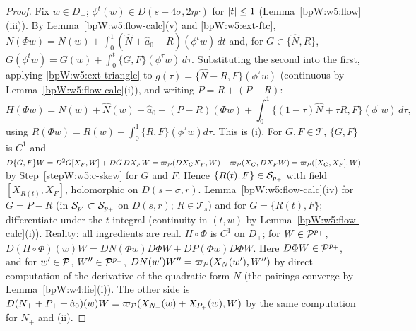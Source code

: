 \begin{proof}
\label{stepW:w5:n-exp} Fix $w\in D_+$; $\phi^t(w)\in D(s-4\sigma,2\eta r)$ for $\lvert t\rvert\le1$
(Lemma~\ref{bpW:w5:flow}(iii)). By Lemma~\ref{bpW:w5:flow-calc}(v) and \ref{bpW:w5:ext-ftc},
$N(\Phi w)=N(w)+\int_0^1(\hat N+\hat a_0-R)(\phi^tw)\,dt$ and, for $G\in\{\hat N,R\}$,
$G(\phi^tw)=G(w)+\int_0^t\{G,F\}(\phi^\tau w)\,d\tau$. Substituting the second into the first, applying
\ref{bpW:w5:ext-triangle} to $g(\tau)=\{\hat N-R,F\}(\phi^\tau w)$ (continuous by Lemma~\ref{bpW:w5:flow-calc}(i)), and writing
$P=R+(P-R)$:
\[H(\Phi w)=N(w)+\hat N(w)+\hat a_0+(P-R)(\Phi w)+\int_0^1\{(1-\tau)\hat N+\tau R,F\}(\phi^\tau w)\,d\tau,\]
using $R(\Phi w)=R(w)+\int_0^1\{R,F\}(\phi^\tau w)d\tau$. This is (i).
\label{stepW:w5:n-br} For $G,F\in\mathcal T$, $\{G,F\}$ is $C^1$ and
$D\{G,F\}W=D^2G[X_F,W]+DG\,DX_FW=\varpi_{\mathcal P}(DX_GX_F,W)+\varpi_{\mathcal P}(X_G,DX_FW)=\varpi_{\mathcal P}([X_G,X_F],W)$ by
Step~\ref{stepW:w5:c-skew} for $G$ and $F$. Hence $\{R(t),F\}\in\mathcal S_{p_+}$ with field $[X_{R(t)},X_F]$, holomorphic on
$D(s-\sigma,r)$.
\label{stepW:w5:n-field} Lemma~\ref{bpW:w5:flow-calc}(iv) for $G=P-R$ (in $\mathcal S_{p'}\subset\mathcal S_{p_+}$ on
$D(s,r)$; $R\in\mathcal T_s$) and for $G=\{R(t),F\}$; differentiate under the $t$-integral (continuity in $(t,w)$ by
Lemma~\ref{bpW:w5:flow-calc}(i)). Reality: all ingredients are real.
\label{stepW:w5:n-conj} $H\circ\Phi$ is $C^1$ on $D_+$; for $W\in\mathcal P^{p_+}$,
$D(H\circ\Phi)(w)W=DN(\Phi w)D\Phi W+DP(\Phi w)D\Phi W$. Here $D\Phi W\in\mathcal P^{p_+}$, and for $w'\in\mathcal P$, $W''\in\mathcal P^{p_+}$,
$DN(w')W''=\varpi_{\mathcal P}(X_N(w'),W'')$ by direct computation of the derivative of the quadratic form $N$ (the pairings converge
by Lemma~\ref{bpW:w4:lie}(i)). The other side is $D(N_++P_++\hat a_0)(w)W=\varpi_{\mathcal P}(X_{N_+}(w)+X_{P_+}(w),W)$ by the same
computation for $N_+$ and (ii).
\end{proof}

